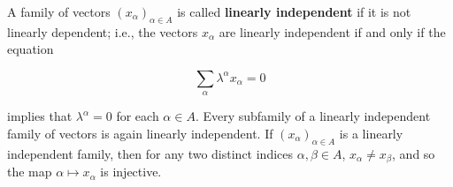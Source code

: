 A family of vectors $(x_{\alpha})_{\alpha \in A}$ is called \textbf{linearly independent} if it is not linearly dependent; i.e., the vectors $x_{\alpha}$ are linearly independent if and only if the equation

$$\sum_{\alpha} \lambda^{\alpha} x_{\alpha} = 0$$

implies that $\lambda^{\alpha} = 0$ for each $\alpha \in A$. Every subfamily of a linearly independent family of vectors is again linearly independent. If $(x_{\alpha})_{\alpha \in A}$ is a linearly independent family, then for any two distinct indices $\alpha, \beta \in A$, $x_{\alpha} \neq x_{\beta}$, and so the map $\alpha \mapsto x_{\alpha}$ is injective.
